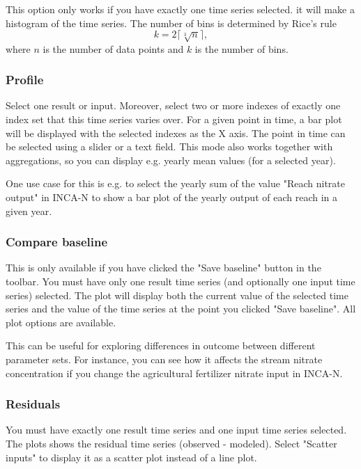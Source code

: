 \documentclass[11pt]{article}
\theoremstyle{definition}
\begin{document}
This option only works if you have exactly one time series selected. it will make a histogram of the time series. The number of bins is determined by %
Rice's rule
\[
k = 2\lceil\sqrt[3]{n}\rceil,
\]
where $n$ is the number of data points and $k$ is the number of bins.

\subsubsection{Profile}

Select one result or input. Moreover, select two or more indexes of exactly one index set that this time series varies over. For a given point in time, a bar plot will be displayed with the selected indexes as the X axis. The point in time can be selected using a slider or a text field. This mode also works together with aggregations, so you can display e.g. yearly mean values (for a selected year).

One use case for this is e.g. to select the yearly sum of the value "Reach nitrate output" in INCA-N to show a bar plot of the yearly output of each reach in a given year.

\subsubsection{Compare baseline}

This is only available if you have clicked the "Save baseline" button in the toolbar. You must have only one result time series (and optionally one input time series) selected. The plot will display both the current value of the selected time series and the value of the time series at the point you clicked "Save baseline". All plot options are available.

This can be useful for exploring differences in outcome between different parameter sets. For instance, you can see how it affects the stream nitrate concentration if you change the agricultural fertilizer nitrate input in INCA-N.

\subsubsection{Residuals}

You must have exactly one result time series and one input time series selected. The plots shows the residual time series (observed - modeled). Select "Scatter inputs" to display it as a scatter plot instead of a line plot.
\end{document}
